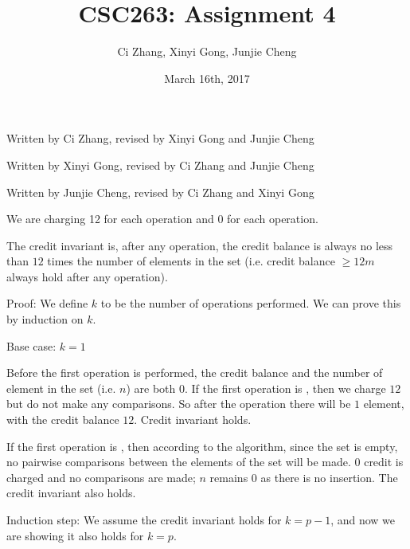 \documentclass[11pt, answers]{exam}
\theoremstyle{plain}
\theoremstyle{definition}
\begin{document}
 


\title{CSC263: Assignment 4}
\date{March 16th, 2017}
\author{Ci Zhang, Xinyi Gong, Junjie Cheng}
\maketitle

\unframedsolutions

\begin{questions}
\question
\begin{solution}Written by Ci Zhang, revised by Xinyi Gong and Junjie Cheng


\end{solution}

\question
\begin{solution}Written by Xinyi Gong, revised by Ci Zhang and Junjie Cheng

\end{solution}


\question
\begin{solution}Written by Junjie Cheng, revised by Ci Zhang and Xinyi Gong


We are charging 12 for each  operation and 0 for each  operation.

The credit invariant is, after any operation, the credit balance is always no less than $12$ times the number of elements in the set (i.e. credit balance $\ge 12m$ always hold after any operation).

Proof: We define $k$ to be the number of operations performed. We can prove this by induction on $k$. 

Base case: $k=1$

Before the first operation is performed, the credit balance and the number of element in the set (i.e. $n$) are both $0$. If the first operation is , then we charge $12$ but do not make any comparisons. So after the operation there will be $1$ element, with the credit balance $12$. Credit invariant holds.

If the first operation is , then according to the algorithm, since the set is empty, no pairwise comparisons between the elements of the set will be made. $0$ credit is charged and no comparisons are made; $n$ remains $0$ as there is no insertion. The credit invariant also holds.

Induction step: We assume the credit invariant holds for $k=p-1$, and now we are showing it also holds for $k=p$.


\end{solution}
\end{questions}
\end{document}
